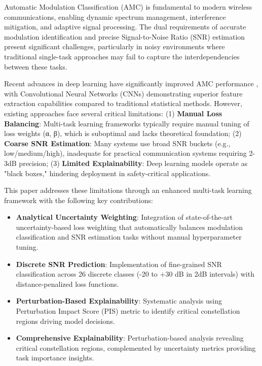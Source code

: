 \documentclass[conference]{IEEEtran}
\begin{document}
Automatic Modulation Classification (AMC) \cite{huynh2021automatic} is fundamental to modern wireless communications, enabling dynamic spectrum management, interference mitigation, and adaptive signal processing. The dual requirements of accurate modulation identification and precise Signal-to-Noise Ratio (SNR) estimation present significant challenges, particularly in noisy environments where traditional single-task approaches may fail to capture the interdependencies between these tasks.

Recent advances in deep learning have significantly improved AMC performance \cite{peng2021survey}, with Convolutional Neural Networks (CNNs) demonstrating superior feature extraction capabilities compared to traditional statistical methods. However, existing approaches face several critical limitations: (1) \textbf{Manual Loss Balancing}: Multi-task learning frameworks typically require manual tuning of loss weights (α, β), which is suboptimal and lacks theoretical foundation; (2) \textbf{Coarse SNR Estimation}: Many systems use broad SNR buckets (e.g., low/medium/high), inadequate for practical communication systems requiring 2-3dB precision; (3) \textbf{Limited Explainability}: Deep learning models operate as "black boxes," hindering deployment in safety-critical applications.

This paper addresses these limitations through an enhanced multi-task learning framework with the following key contributions:

\begin{itemize}
\item \textbf{Analytical Uncertainty Weighting}: Integration of state-of-the-art uncertainty-based loss weighting that automatically balances modulation classification and SNR estimation tasks without manual hyperparameter tuning.
\item \textbf{Discrete SNR Prediction}: Implementation of fine-grained SNR classification across 26 discrete classes (-20 to +30 dB in 2dB intervals) with distance-penalized loss functions.
\item \textbf{Perturbation-Based Explainability}: Systematic analysis using Perturbation Impact Score (PIS) metric to identify critical constellation regions driving model decisions.
\item \textbf{Comprehensive Explainability}: Perturbation-based analysis revealing critical constellation regions, complemented by uncertainty metrics providing task importance insights.
\end{itemize}
\end{document}
